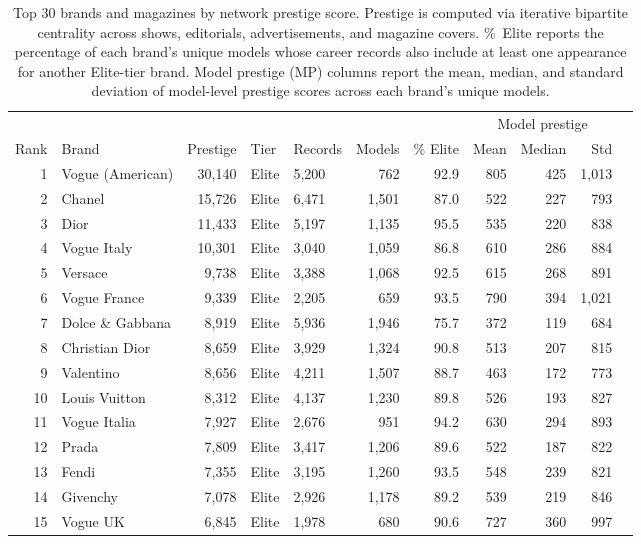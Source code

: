 \begin{table}[htbp]
\centering
\caption{Top 30 brands and magazines by network prestige score. Prestige is computed via iterative bipartite centrality across shows, editorials, advertisements, and magazine covers. \%~Elite reports the percentage of each brand's unique models whose career records also include at least one appearance for another Elite-tier brand. Model prestige (MP) columns report the mean, median, and standard deviation of model-level prestige scores across each brand's unique models.}
\label{tab:hierarchy_top30}
\small
\begin{tabular}{rlrllrrrrrr}
\toprule
 & & & & & & & \multicolumn{3}{c}{Model prestige} \\
\cmidrule(lr){8-10}
Rank & Brand & Prestige & Tier & Records & Models & \% Elite & Mean & Median & Std \\
\midrule
1 & Vogue (American) & 30,140 & Elite & 5,200 & 762 & 92.9 & 805 & 425 & 1,013 \\
2 & Chanel & 15,726 & Elite & 6,471 & 1,501 & 87.0 & 522 & 227 & 793 \\
3 & Dior & 11,433 & Elite & 5,197 & 1,135 & 95.5 & 535 & 220 & 838 \\
4 & Vogue Italy & 10,301 & Elite & 3,040 & 1,059 & 86.8 & 610 & 286 & 884 \\
5 & Versace & 9,738 & Elite & 3,388 & 1,068 & 92.5 & 615 & 268 & 891 \\
6 & Vogue France & 9,339 & Elite & 2,205 & 659 & 93.5 & 790 & 394 & 1,021 \\
7 & Dolce \& Gabbana & 8,919 & Elite & 5,936 & 1,946 & 75.7 & 372 & 119 & 684 \\
8 & Christian Dior & 8,659 & Elite & 3,929 & 1,324 & 90.8 & 513 & 207 & 815 \\
9 & Valentino & 8,656 & Elite & 4,211 & 1,507 & 88.7 & 463 & 172 & 773 \\
10 & Louis Vuitton & 8,312 & Elite & 4,137 & 1,230 & 89.8 & 526 & 193 & 827 \\
11 & Vogue Italia & 7,927 & Elite & 2,676 & 951 & 94.2 & 630 & 294 & 893 \\
12 & Prada & 7,809 & Elite & 3,417 & 1,206 & 89.6 & 522 & 187 & 822 \\
13 & Fendi & 7,355 & Elite & 3,195 & 1,260 & 93.5 & 548 & 239 & 821 \\
14 & Givenchy & 7,078 & Elite & 2,926 & 1,178 & 89.2 & 539 & 219 & 846 \\
15 & Vogue UK & 6,845 & Elite & 1,978 & 680 & 90.6 & 727 & 360 & 997 \\

\end{tabular}
\end{table}
